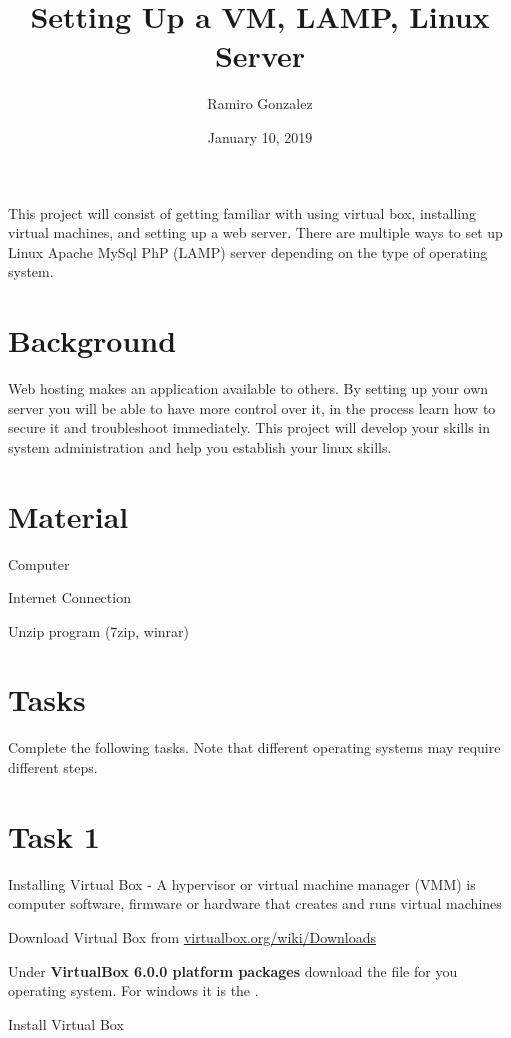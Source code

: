\documentclass[12pt]{article}
\begin{document}
\title{ Setting Up a VM, LAMP, Linux Server}
\author{Ramiro Gonzalez}
\date{January 10, 2019}

\maketitle

\begin{Objective}
	This project will consist of getting familiar with using virtual box, installing virtual machines, and setting up a web server.  There are multiple ways to set up Linux Apache MySql PhP (LAMP) server depending on the type of operating system. 
\end{Objective}

\section*{Background}
	Web hosting makes an application available to others.  By setting up your own server you will be able to have more control over it, in the process learn how to secure it and troubleshoot immediately. This project will develop your skills in system administration and help you establish your linux skills. 
\section*{Material}
 \color{black}
\begin{todolist}
    \item Computer 
    \item Internet Connection
    \item Unzip program (7zip, winrar) 
\end{todolist}
\section{Tasks}
Complete the following tasks. Note that different operating systems may require different steps. 
\section*{Task 1}
Installing Virtual Box - 
A hypervisor or virtual machine manager (VMM) is computer software, firmware or hardware that creates and runs virtual machines
\begin{todolist}
	  \item Download Virtual Box from \color{red} \href{https://www.virtualbox.org/wiki/Downloads}{virtualbox.org/wiki/Downloads}\color{black} 
	  \item Under \textbf{VirtualBox 6.0.0 platform packages} download the file for you operating system. For windows it is the . 
	  \item Install Virtual Box
\end{todolist}
\end{document}
